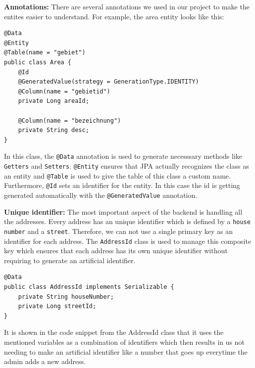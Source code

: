     \textbf{Annotations:} \newline
    There are several annotations we used in our project to make the entites easier to understand. For example, the area entity looks like this:  
    \lstset{style=mycsharp, caption=Area Entity}
    \begin{lstlisting}
@Data
@Entity
@Table(name = "gebiet")
public class Area {
    @Id
    @GeneratedValue(strategy = GenerationType.IDENTITY)
    @Column(name = "gebietid")
    private Long areaId;
        
    @Column(name = "bezeichnung")
    private String desc;
}                  
    \end{lstlisting} 

    In this class, the \texttt{@Data} annotation is used to generate necesssary methods like \texttt{Getters} and \texttt{Setters}. \texttt{@Entity} ensures that JPA actually recognizes the class as an entity and \texttt{@Table} is used to give the table of this class a custom name. Furthermore, \texttt{@Id} sets an identifier for the entity. In this case the id is getting generated automatically with the \texttt{@GeneratedValue} annotation. \newline
    
    \textbf{Unique identifier:} \newline
    The most important aspect of the backend is handling all the addresses. Every address has an unique identifier which is defined by a \texttt{house number} and a \texttt{street}. Therefore, we can not use a single primary key as an identifier for each address. \newline
    The \texttt{AddressId} class is used to manage this composite key which ensures that each address has its own unique identifier without requiring to generate an artificial identifier.
    \lstset{style=mycsharp, caption=AddressId}
    \begin{lstlisting}
@Data
public class AddressId implements Serializable { 
    private String houseNumber;
    private Long streetId;
}                         
    \end{lstlisting} 
    It is shown in the code snippet from the AddressId class that it uses the mentioned variables as a combination of identifiers which then results in us not needing to make an artificial identifier like a number that goes up everytime the admin adds a new address. \newline

